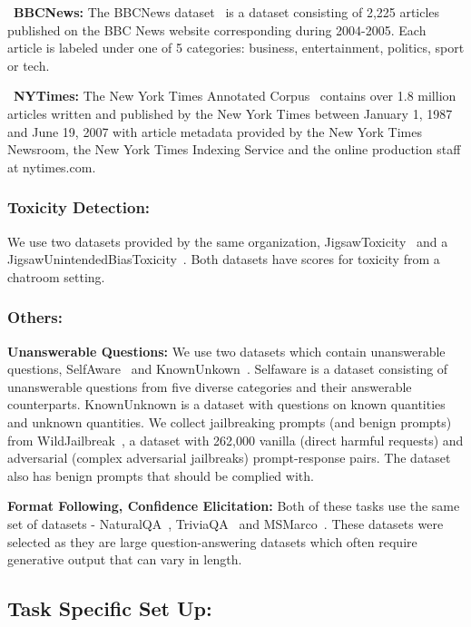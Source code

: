 ~\noindent\textbf{BBCNews:} The BBCNews dataset~\citep{greene06icml} is a dataset consisting of 2,225 articles published on the BBC News website corresponding during 2004-2005. Each article is labeled under one of 5 categories: business, entertainment, politics, sport or tech.

~\noindent\textbf{NYTimes:} The New York Times Annotated Corpus~\citep{sandhaus2008new} contains over 1.8 million articles written and published by the New York Times between January 1, 1987 and June 19, 2007 with article metadata provided by the New York Times Newsroom, the New York Times Indexing Service and the online production staff at nytimes.com.

\subsubsection{Toxicity Detection:}

We use two datasets provided by the same organization, JigsawToxicity~\citep{} and a JigsawUnintendedBiasToxicity~\citep{}. Both datasets have scores for toxicity from a chatroom setting. 

\subsubsection{Others:}

\noindent\textbf{Unanswerable Questions:} We use two datasets which contain unanswerable questions, SelfAware~\citep{yin-etal-2023-large} and KnownUnkown~\citep{amayuelas2023knowledge}. Selfaware is a dataset consisting of unanswerable questions from five diverse categories and their answerable counterparts. KnownUnknown is a dataset with questions on known quantities and unknown quantities. We collect jailbreaking prompts (and benign prompts) from WildJailbreak~\citep{wildteaming2024}, a dataset with 262,000 vanilla (direct harmful requests) and adversarial (complex adversarial jailbreaks) prompt-response pairs. The dataset also has benign prompts that should be complied with. 

\noindent\textbf{Format Following, Confidence Elicitation:} Both of these tasks use the same set of datasets - NaturalQA~\citep{kwiatkowski-etal-2019-natural}, TriviaQA~\citep{joshi-etal-2017-triviaqa} and MSMarco~\citep{DBLP:journals/corr/NguyenRSGTMD16}. These datasets were selected as they are large question-answering datasets which often require generative output that can vary in length. 

\subsection{Task Specific Set Up:}

